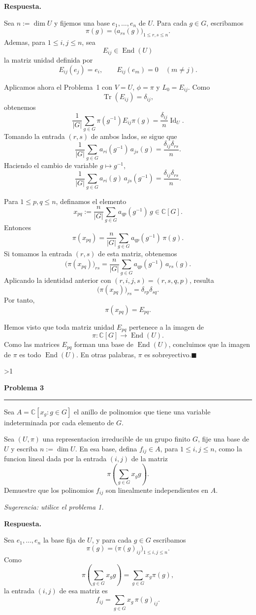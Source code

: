 \documentclass[10pt,a4paper]{article}
\newcommand{\CC}{\mathbb{C}}
\newcommand{\inlinehead}[2][repblue]{%
  \par\smallskip
  {\color{#1}\bfseries #2.}\hspace{0.45em}%
}
\newcommand{\answer}{\inlinehead{Respuesta}}
\newcounter{probcnt}
\newcommand{\problem}[2]{%
  \stepcounter{probcnt}%
  \ifnum\value{probcnt}>1\newpage\fi
  \par\vspace{0.25em}
  {\large\bfseries\color{repblue} Problema #1}\par
  {\color{repline}\rule{\linewidth}{0.55pt}}\par
  \begin{tcolorbox}[
    breakable,
    colback=white,
    colframe=repline,
    borderline west={1.6pt}{0pt}{repteal},
    left=0.7em,
    right=0.7em,
    top=0.35em,
    bottom=0.3em,
    before skip=0.35em,
    after skip=0.45em
  ]
    #2
  \end{tcolorbox}
}
\begin{document}
\answer
Sea $n:=\dim U$ y fijemos una base $e_1,\dots,e_n$ de $U$. Para cada
$g\in G$, escribamos
\[
  \pi(g)=\bigl(a_{rs}(g)\bigr)_{1\le r,s\le n}.
\]
Ademas, para $1\le i,j\le n$, sea
\[
  E_{ij}\in \operatorname{End}(U)
\]
la matriz unidad definida por
\[
  E_{ij}(e_j)=e_i,
  \qquad
  E_{ij}(e_m)=0 \quad (m\neq j).
\]

Aplicamos ahora el Problema~1 con $V=U$, $\phi=\pi$ y $L_0=E_{ij}$. Como
\[
  \operatorname{Tr}(E_{ij})=\delta_{ij},
\]
obtenemos
\[
  \frac{1}{|G|}\sum_{g\in G}\pi(g^{-1})E_{ij}\pi(g)
  =\frac{\delta_{ij}}{n}\operatorname{Id}_U.
\]
Tomando la entrada $(r,s)$ de ambos lados, se sigue que
\[
  \frac{1}{|G|}\sum_{g\in G} a_{ri}(g^{-1})\,a_{js}(g)
  =\frac{\delta_{ij}\delta_{rs}}{n}.
\]
Haciendo el cambio de variable $g\mapsto g^{-1}$,
\[
  \frac{1}{|G|}\sum_{g\in G} a_{ri}(g)\,a_{js}(g^{-1})
  =\frac{\delta_{ij}\delta_{rs}}{n}.
\]

Para $1\le p,q\le n$, definamos el elemento
\[
  x_{pq}:=\frac{n}{|G|}\sum_{g\in G} a_{qp}(g^{-1})\,g \in \CC[G].
\]
Entonces
\[
  \pi(x_{pq})
  =\frac{n}{|G|}\sum_{g\in G} a_{qp}(g^{-1})\,\pi(g).
\]
Si tomamos la entrada $(r,s)$ de esta matriz, obtenemos
\[
  \bigl(\pi(x_{pq})\bigr)_{rs}
  =\frac{n}{|G|}\sum_{g\in G} a_{qp}(g^{-1})\,a_{rs}(g).
\]
Aplicando la identidad anterior con $(r,i,j,s)=(r,s,q,p)$, resulta
\[
  \bigl(\pi(x_{pq})\bigr)_{rs}
  =\delta_{rp}\delta_{sq}.
\]
Por tanto,
\[
  \pi(x_{pq})=E_{pq}.
\]

Hemos visto que toda matriz unidad $E_{pq}$ pertenece a la imagen de
\[
  \pi:\CC[G]\to \operatorname{End}(U).
\]
Como las matrices $E_{pq}$ forman una base de $\operatorname{End}(U)$,
concluimos que la imagen de $\pi$ es todo $\operatorname{End}(U)$. En otras
palabras, $\pi$ es sobreyectivo.\hfill$\blacksquare$

\problem{3}{%
Sea $A=\CC[x_g:g\in G]$ el anillo de polinomios que tiene una variable
indeterminada por cada elemento de $G$.

Sea $(U,\pi)$ una representacion irreducible de un grupo finito $G$, fije una
base de $U$ y escriba $n:=\dim U$. En esa base, defina $f_{ij}\in A$, para
$1\le i,j\le n$, como la funcion lineal dada por la entrada $(i,j)$ de la matriz
\[
  \pi\!\left(\sum_{g\in G} x_g g\right).
\]
Demuestre que los polinomios $f_{ij}$ son linealmente independientes en $A$.

\smallskip
\textit{Sugerencia: utilice el problema 1.}
}

\answer
Sea $e_1,\dots,e_n$ la base fija de $U$, y para cada $g\in G$ escribamos
\[
  \pi(g)=\bigl(\pi(g)_{ij}\bigr)_{1\le i,j\le n}.
\]
Como
\[
  \pi\!\left(\sum_{g\in G} x_g g\right)=\sum_{g\in G} x_g\pi(g),
\]
la entrada $(i,j)$ de esa matriz es
\[
  f_{ij}=\sum_{g\in G} x_g\,\pi(g)_{ij}.
\]
\end{document}
